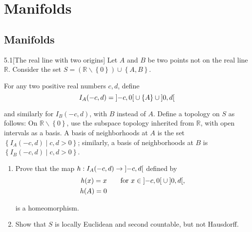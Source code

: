 \chapter{Manifolds}

\section{Manifolds}

\begin{problem}{5.1}[The real line with two origins]
Let \( A \) and \( B \) be two points not on the real line \( \mathbb{R} \). Consider the set \( S = (\mathbb{R} \smallsetminus \left\{0\right\}) \cup \left\{A, B\right\} \).

For any two positive real numbers \( c, d \), define
\[
    I_{A}(-c, d) = \left\rbrack{-c, 0}\right\lbrack \cup \left\{A\right\} \cup \left\rbrack{0, d}\right\lbrack
\]

and similarly for \( I_{B}(-c, d) \), with \( B \) instead of \( A \). Define a topology on \( S \) as follows: On \( \mathbb{R} \smallsetminus \left\{0\right\} \), use the subspace topology inherited from \( \mathbb{R} \), with open intervals as a basis. A basis of neighborhoods at \( A \) is the set \( \left\{ I_{A}(-c, d) \mid c, d > 0 \right\} \); similarly, a basis of neighborhoods at \( B \) is \( \left\{ I_{B}(-c, d) \mid c, d > 0 \right\} \).

\begin{enumerate}[label={(\alph*)}]
    \item Prove that the map \( h: I_{A}(-c,d) \to \left\rbrack{-c, d}\right\lbrack \) defined by
          \begin{align*}
              h(x) = x & \qquad \text{for \( x \in \left\rbrack{-c, 0}\right\lbrack \cup \left\rbrack{0, d}\right\lbrack \)}, \\
              h(A) = 0
          \end{align*}

          is a homeomorphism.
    \item Show that \( S \) is locally Euclidean and second countable, but not Hausdorff.
\end{enumerate}
\end{problem}

